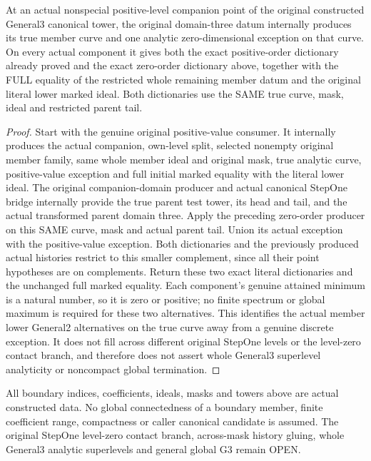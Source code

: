 \begin{theorem}
\label{hir:member-monomial-original-general-three-consumer}
\leanok
At an actual nonspecial positive-level companion point of the original
constructed General3 canonical tower, the original domain-three datum
internally produces its true member curve and one analytic zero-dimensional
exception on that curve. On every actual component it gives both the exact
positive-order dictionary already proved and the exact zero-order dictionary
above, together with the FULL equality of the restricted whole remaining
member datum and the original literal lower marked ideal. Both dictionaries
use the SAME true curve, mask, ideal and restricted parent tail.
\end{theorem}
\begin{proof}
Start with the genuine original positive-value consumer. It internally
produces the actual companion, own-level split, selected nonempty original
member family, same whole member ideal and original mask, true analytic curve,
positive-value exception and full initial marked equality with the literal
lower ideal. The original companion-domain producer and actual canonical
StepOne bridge internally provide the true parent test tower, its head and
tail, and the actual transformed parent domain three. Apply the preceding
zero-order producer on this SAME curve, mask and actual parent tail. Union
its actual exception with the positive-value exception. Both dictionaries
and the previously produced actual histories restrict to this smaller
complement, since all their point hypotheses are on complements. Return
these two exact literal dictionaries and the unchanged full marked equality.
Each component's genuine attained minimum is a natural number, so it is zero
or positive; no finite spectrum or global maximum is required for these two
alternatives. This identifies the actual member lower General2 alternatives
on the true curve away from a genuine discrete exception. It does not fill
across different original StepOne levels or the level-zero contact branch,
and therefore does not assert whole General3 superlevel analyticity or
noncompact global termination.
\end{proof}

\begin{remark}
All boundary indices, coefficients, ideals, masks and towers above are actual
constructed data. No global connectedness of a boundary member, finite
coefficient range, compactness or caller canonical candidate is assumed.
The original StepOne level-zero contact branch, across-mask history gluing,
whole General3 analytic superlevels and general global G3 remain OPEN.
\end{remark}
